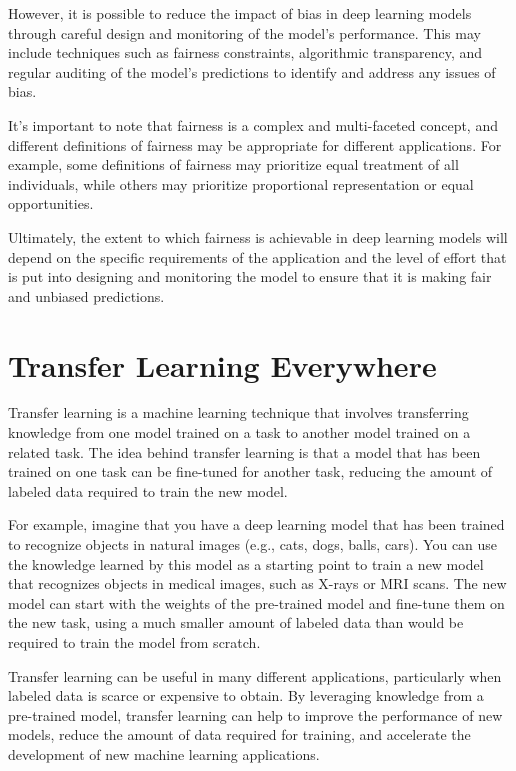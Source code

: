 However, it is possible to reduce the impact of bias in deep learning models through careful design and monitoring of the model's performance. This may include techniques such as fairness constraints, algorithmic transparency, and regular auditing of the model's predictions to identify and address any issues of bias.

It's important to note that fairness is a complex and multi-faceted concept, and different definitions of fairness may be appropriate for different applications. For example, some definitions of fairness may prioritize equal treatment of all individuals, while others may prioritize proportional representation or equal opportunities.

Ultimately, the extent to which fairness is achievable in deep learning models will depend on the specific requirements of the application and the level of effort that is put into designing and monitoring the model to ensure that it is making fair and unbiased predictions.

\section{Transfer Learning Everywhere}

Transfer learning is a machine learning technique that involves transferring knowledge from one model trained on a task to another model trained on a related task. The idea behind transfer learning is that a model that has been trained on one task can be fine-tuned for another task, reducing the amount of labeled data required to train the new model.

For example, imagine that you have a deep learning model that has been trained to recognize objects in natural images (e.g., cats, dogs, balls, cars). You can use the knowledge learned by this model as a starting point to train a new model that recognizes objects in medical images, such as X-rays or MRI scans. The new model can start with the weights of the pre-trained model and fine-tune them on the new task, using a much smaller amount of labeled data than would be required to train the model from scratch.

Transfer learning can be useful in many different applications, particularly when labeled data is scarce or expensive to obtain. By leveraging knowledge from a pre-trained model, transfer learning can help to improve the performance of new models, reduce the amount of data required for training, and accelerate the development of new machine learning applications.

